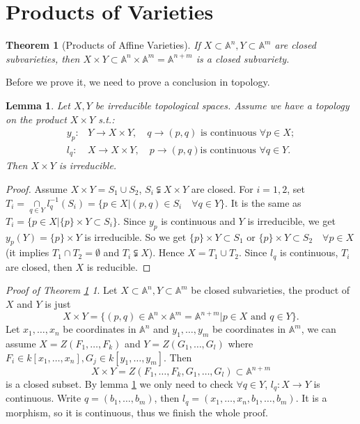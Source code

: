 \documentclass{amsart}
\theoremstyle{plain}
\newtheorem{theorem}{Theorem}
\newtheorem{lemma}{Lemma}
\theoremstyle{definition}
\theoremstyle{remark}
\newtheorem*{proofofproductsofaffinevarieties}{Proof of Theorem \ref{15}}
\numberwithin{equation}{section}
\begin{document}
 \section{Products of Varieties}
\begin{theorem}[Products of Affine Varieties]\label{15}
	If $ X\subset \mathbb{A}^n,Y\subset \mathbb{A}^m $ are closed subvarieties, then $ X\times Y\subset \mathbb{A}^n\times \mathbb{A}^m=\mathbb{A}^{n+m} $ is a closed subvariety.
\end{theorem}
Before we prove it, we need to prove a conclusion in topology.
\begin{lemma}\label{16}
	Let $ X,Y $ be irreducible topological spaces. Assume we have a topology on the product $ X\times Y $ s.t.:
	$$\begin{array}{cc}
		y_p: & Y\to X\times Y, \quad q\to (p,q) \text{ is continuous }\forall p\in X;\\
		l_q: & X\to X\times Y, \quad p\to (p,q) \text{is continuous }\forall q\in Y.
	\end{array}$$
	Then $ X\times Y $ is irreducible.
\end{lemma}
\begin{proof}
	Assume $ X\times Y=S_1\cup S_2 $, $ S_i\subsetneqq X\times Y $ are closed. For $ i=1,2 $, set $ T_i=\mathop{\cap}\limits_{q\in Y}l_q^{-1}(S_i)=\{ p\in X|(p,q)\in S_i \quad\forall q\in Y \} $. It is the same as $ T_i=\{ p\in X|\{ p \}\times Y\subset S_i \} $. Since $ y_p $ is continuous and $ Y $ is irreducible, we get $ y_p(Y)=\{p\}\times Y $ is irreducible. So we get $ \{p\}\times Y\subset S_1 $ or $ \{p\}\times Y\subset S_2 \quad\forall p\in X$(it implies $ T_1\cap T_2=\emptyset $ and $ T_i\subsetneqq X $). Hence $ X=T_1\cup T_2 $. Since $ l_q $ is continuous, $ T_i $ are closed, then $ X $ is reducible.
\end{proof}
\begin{proofofproductsofaffinevarieties}
	Let $ X\subset \mathbb{A}^n,Y\subset \mathbb{A}^m $ be closed subvarieties, the product of $ X $ and $ Y $ is just
	$$
		X\times Y=\{ (p,q)\in \mathbb{A}^n\times \mathbb{A}^m=\mathbb{A}^{n+m}|p\in X \text{ and }q\in Y \}.
	$$
	Let $ x_1,\dots,x_n $ be coordinates in $ \mathbb{A}^n $ and $ y_1,\dots,y_m $ be coordinates in $ \mathbb{A}^m $, we can assume $ X=Z(F_1,\dots,F_k) $ and $ Y=Z(G_1,\dots,G_l) $ where $ F_i\in k[x_1,\dots,x_n],G_j\in k[y_1,\dots,y_m] $. Then
	\begin{equation}
	X\times Y= Z(F_1,\dots,F_k,G_1,\dots,G_l)\subset \mathbb{A}^{n+m}
	\end{equation}
	is a closed subset. By lemma \ref{16} we only need to check  $\forall  q\in Y $, $ l_q:X\to Y $ is continuous. Write $ q=(b_1,\dots,b_m) $, then $ l_q=(x_1,\dots,x_n,b_1,\dots,b_m) $. It is a morphism, so it is continuous, thus we finish the whole proof.
\end{proofofproductsofaffinevarieties}
\end{document}
